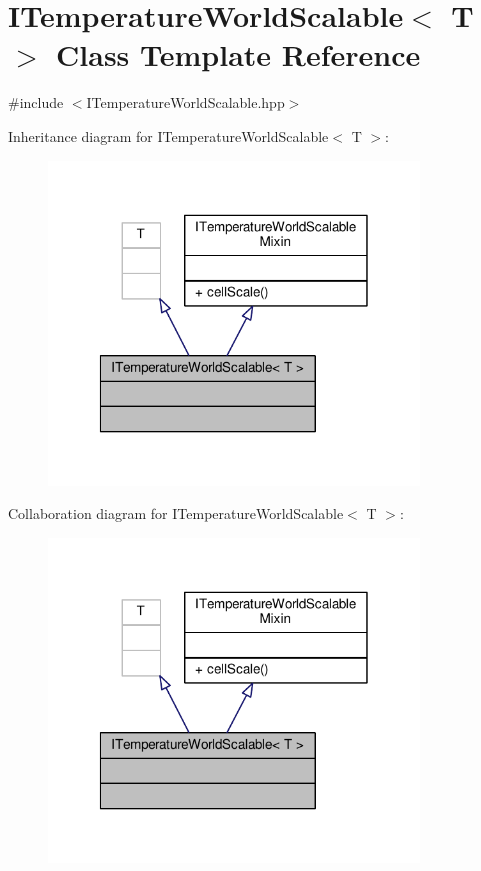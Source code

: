 \hypertarget{class_i_temperature_world_scalable}{\section{I\-Temperature\-World\-Scalable$<$ T $>$ Class Template Reference}
\label{class_i_temperature_world_scalable}
}


{\ttfamily \#include $<$I\-Temperature\-World\-Scalable.\-hpp$>$}



Inheritance diagram for I\-Temperature\-World\-Scalable$<$ T $>$\-:
\nopagebreak
\begin{figure}[H]
\begin{center}
\leavevmode
\includegraphics[width=279pt]{class_i_temperature_world_scalable__inherit__graph}
\end{center}
\end{figure}


Collaboration diagram for I\-Temperature\-World\-Scalable$<$ T $>$\-:
\nopagebreak
\begin{figure}[H]
\begin{center}
\leavevmode
\includegraphics[width=279pt]{class_i_temperature_world_scalable__coll__graph}
\end{center}
\end{figure}
